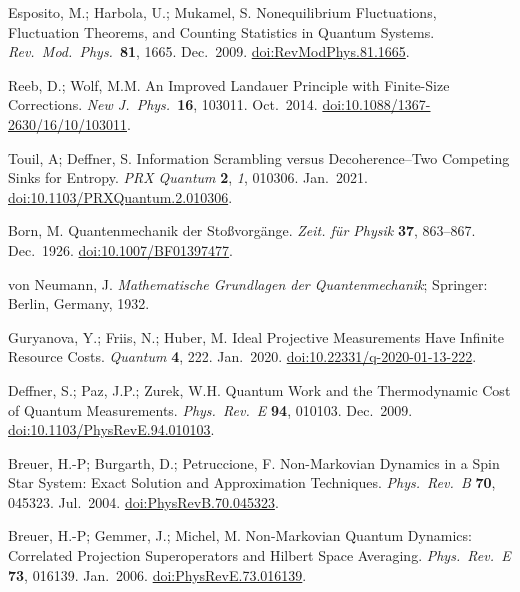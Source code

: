 \documentclass[preprints,article,accept,moreauthors,pdftex]{Definitions/mdpi}
\begin{document}
\begin{thebibliography}{999}
Esposito, M.; Harbola, U.; Mukamel, S\@. Nonequilibrium Fluctuations, Fluctuation Theorems, and Counting Statistics in Quantum Systems. {\em Rev.\ Mod.\ Phys.}\ {\bf 81}, 1665. Dec.\ 2009. \href{https://doi.org/10.1103/RevModPhys.81.1665}{doi:RevModPhys.81.1665}.

Reeb, D.; Wolf, M.M\@. An Improved Landauer Principle with Finite-Size Corrections. {\em New J.\ Phys.}\ {\bf 16}, 103011. Oct.\ 2014. \href{https://doi.org/10.1088/1367-2630/16/10/103011}{doi:10.1088/1367-2630/16/10/103011}.

Touil, A; Deffner, S\@. Information Scrambling versus Decoherence--Two Competing Sinks for Entropy. {\em PRX Quantum} {\bf 2}, {\em 1}, 010306. Jan.\ 2021. \href{https://doi.org/10.1103/PRXQuantum.2.010306}{doi:10.1103/PRXQuantum.2.010306}.

Born, M\@. Quantenmechanik der Stoßvorgänge. {\em Zeit. für Physik} {\bf 37}, 863--867. Dec.\ 1926. \href{https://doi.org/10.1007/BF01397477}{doi:10.1007/BF01397477}.

von Neumann, J\@. \emph{Mathematische Grundlagen der Quantenmechanik}; Springer: Berlin, Germany, 1932.

Guryanova, Y.; Friis, N.; Huber, M\@. Ideal Projective Measurements Have Infinite Resource Costs. {\em Quantum} {\bf 4}, 222. Jan.\ 2020. \href{	https://doi.org/10.22331/q-2020-01-13-222}{doi:10.22331/q-2020-01-13-222}.

Deffner, S.; Paz, J.P.; Zurek, W.H\@. Quantum Work and the Thermodynamic Cost of Quantum Measurements. {\em Phys.\ Rev.\ E} {\bf 94}, 010103. Dec.\ 2009. \href{https://doi.org/10.1103/PhysRevE.94.010103}{doi:10.1103/PhysRevE.94.010103}.

Breuer, H.-P; Burgarth, D.; Petruccione, F\@. Non-Markovian Dynamics in a Spin Star System: Exact Solution and Approximation Techniques. {\em Phys.\ Rev.\ B} {\bf 70}, 045323. Jul.\ 2004. \href{https://doi.org/10.1103/PhysRevB.70.045323}{doi:PhysRevB.70.045323}.

Breuer, H.-P; Gemmer, J.; Michel, M\@. Non-Markovian Quantum Dynamics: Correlated Projection Superoperators and Hilbert Space Averaging. {\em Phys.\ Rev.\ E} {\bf 73}, 016139. Jan.\ 2006. \href{https://doi.org/10.1103/PhysRevE.73.016139}{doi:PhysRevE.73.016139}.


\end{thebibliography}
\end{document}
